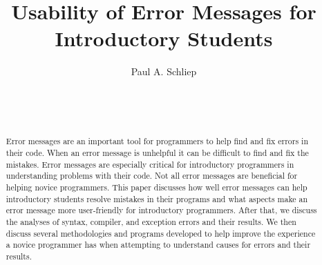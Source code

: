 \documentclass{sig-alternate}
\begin{document}

\title{Usability of Error Messages for Introductory Students}


\author{
\alignauthor
Paul A. Schliep\\
	\\
	\\
	\\
}

\maketitle
\begin{abstract}
Error messages are an important tool for programmers to help find and fix errors in their code.
When an error message is unhelpful it can be difficult to find and fix the mistakes.
Error messages are especially critical for introductory programmers in understanding problems with their code.
Not all error messages are beneficial for helping novice programmers.
This paper discusses how well error messages can help introductory students resolve mistakes in their programs and what aspects make an error message more user-friendly for introductory programmers.
After that, we discuss the analyses of syntax, compiler, and exception errors and their results.
We then discuss several methodologies and programs developed to help improve the experience a novice programmer has when attempting to understand causes for errors and their results.

\end{abstract}

\end{document}
